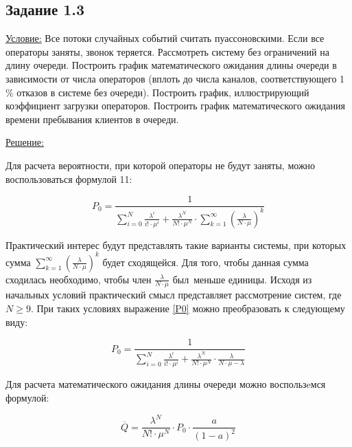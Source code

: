 \subsection*{Задание 1.3}

\underline{Условие:} Все потоки случайных событий считать пуассоновскими. Если все операторы заняты, звонок теряется. Рассмотреть систему без ограничений на длину очереди. Построить график математического ожидания длины очереди в зависимости от числа операторов (вплоть до числа каналов, соответствующего 1$\%$  отказов в системе без очереди). Построить график, иллюстрирующий коэффициент загрузки операторов. Построить график математического ожидания времени пребывания клиентов в очереди.\par

\underline{Решение:}\par

Для расчета вероятности, при которой операторы не будут заняты, можно воспользоваться формулой 11:\par


\begin{equation} \label{P0}
    P_{0}=\frac{1}{ \sum _{i=0}^{N}\frac{ \lambda ^{i}}{i! \cdot  \mu ^{i}}+\frac{ \lambda ^{N}}{N! \cdot  \mu ^{N}} \cdot  \sum _{k=1}^{\infty} \left( \frac{ \lambda }{N \cdot  \mu } \right) ^{k}} 
\end{equation} \par

Практический интерес будут представлять такие варианты системы, при которых сумма  \(  \sum _{k=1}^{\infty} \left( \frac{ \lambda }{N \cdot  \mu } \right) ^{k}  \) будет сходящейся. Для того, чтобы данная сумма сходилась необходимо, чтобы член  \( \frac{ \lambda }{N \cdot  \mu }  \) был\ меньше единицы. Исходя из начальных условий практический смысл представляет  рассмотрение систем, где  \( N \geq 9. \)  При таких условиях выражение \ref{P0} можно преобразовать к следующему виду:\par

\begin{equation}
 P_{0}=\frac{1}{ \sum _{i=0}^{N}\frac{ \lambda ^{i}}{i! \cdot  \mu ^{i}}+\frac{ \lambda ^{N}}{N! \cdot  \mu ^{N}} \cdot \frac{ \lambda }{N \cdot  \mu - \lambda }}
\end{equation} \par

Для расчета математического ожидания длины очереди можно воспользeмся формулой:\par

  \begin{equation} \overline{Q}=\frac{ \lambda ^{N}}{N! \cdot  \mu ^{N}} \cdot P_{0} \cdot \frac{a}{ \left( 1-a \right) ^{2}}     \end{equation} \par

